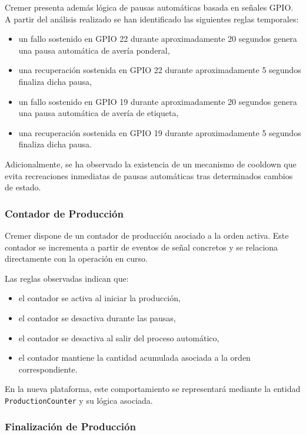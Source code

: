 Cremer presenta además lógica de pausas automáticas basada en señales GPIO. A partir del análisis realizado se han identificado las siguientes reglas temporales:

\begin{itemize}
    \item un fallo sostenido en GPIO 22 durante aproximadamente 20 segundos genera una pausa automática de avería ponderal,
    \item una recuperación sostenida en GPIO 22 durante aproximadamente 5 segundos finaliza dicha pausa,
    \item un fallo sostenido en GPIO 19 durante aproximadamente 20 segundos genera una pausa automática de avería de etiqueta,
    \item una recuperación sostenida en GPIO 19 durante aproximadamente 5 segundos finaliza dicha pausa.
\end{itemize}

Adicionalmente, se ha observado la existencia de un mecanismo de cooldown que evita recreaciones inmediatas de pausas automáticas tras determinados cambios de estado.

\subsubsection{Contador de Producción}

Cremer dispone de un contador de producción asociado a la orden activa. Este contador se incrementa a partir de eventos de señal concretos y se relaciona directamente con la operación en curso.

Las reglas observadas indican que:

\begin{itemize}
    \item el contador se activa al iniciar la producción,
    \item el contador se desactiva durante las pausas,
    \item el contador se desactiva al salir del proceso automático,
    \item el contador mantiene la cantidad acumulada asociada a la orden correspondiente.
\end{itemize}

En la nueva plataforma, este comportamiento se representará mediante la entidad \texttt{ProductionCounter} y su lógica asociada.

\subsubsection{Finalización de Producción}


